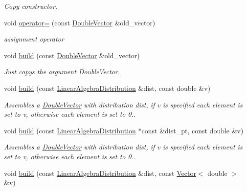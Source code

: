 \begin{DoxyCompactItemize}
\begin{DoxyCompactList}\small\item\em Copy constructor. \end{DoxyCompactList}\item 
void \hyperlink{classoomph_1_1DoubleVector_ab5f56f41d86a18bba358912b1c4f2dac}{operator=} (const \hyperlink{classoomph_1_1DoubleVector}{Double\+Vector} \&old\+\_\+vector)
\begin{DoxyCompactList}\small\item\em assignment operator \end{DoxyCompactList}\item 
void \hyperlink{classoomph_1_1DoubleVector_a7bcc94c157d6853a0f0502e8a76ed380}{build} (const \hyperlink{classoomph_1_1DoubleVector}{Double\+Vector} \&old\+\_\+vector)
\begin{DoxyCompactList}\small\item\em Just copys the argument \hyperlink{classoomph_1_1DoubleVector}{Double\+Vector}. \end{DoxyCompactList}\item 
void \hyperlink{classoomph_1_1DoubleVector_ad22d075ba35995e26f40209de1b25746}{build} (const \hyperlink{classoomph_1_1LinearAlgebraDistribution}{Linear\+Algebra\+Distribution} \&dist, const double \&v)
\begin{DoxyCompactList}\small\item\em Assembles a \hyperlink{classoomph_1_1DoubleVector}{Double\+Vector} with distribution dist, if v is specified each element is set to v, otherwise each element is set to 0.. \end{DoxyCompactList}\item 
void \hyperlink{classoomph_1_1DoubleVector_a84d5a0b2335fb1af865c84f8f25421e9}{build} (const \hyperlink{classoomph_1_1LinearAlgebraDistribution}{Linear\+Algebra\+Distribution} $\ast$const \&dist\+\_\+pt, const double \&v)
\begin{DoxyCompactList}\small\item\em Assembles a \hyperlink{classoomph_1_1DoubleVector}{Double\+Vector} with distribution dist, if v is specified each element is set to v, otherwise each element is set to 0.. \end{DoxyCompactList}\item 
void \hyperlink{classoomph_1_1DoubleVector_a73332fc4a200a32d7281ceb548375d8a}{build} (const \hyperlink{classoomph_1_1LinearAlgebraDistribution}{Linear\+Algebra\+Distribution} \&dist, const \hyperlink{classoomph_1_1Vector}{Vector}$<$ double $>$ \&v)

\end{DoxyCompactItemize}
